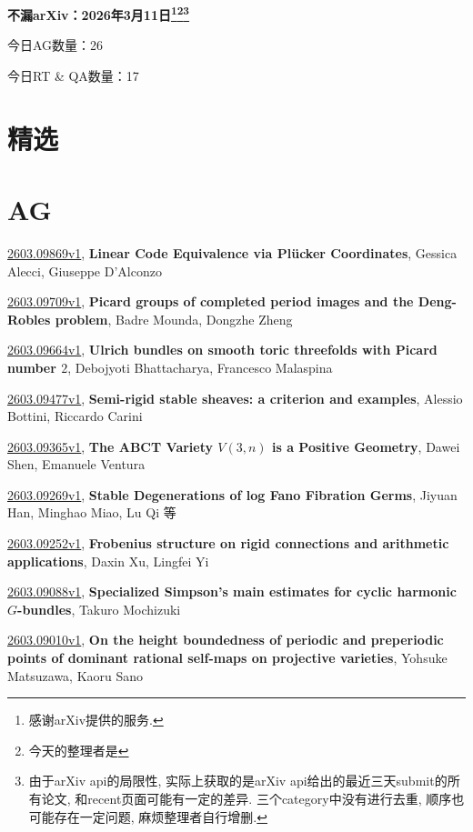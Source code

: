 \documentclass[9pt, a4paper]{article}
\theoremstyle{plain}
\theoremstyle{definition}
\theoremstyle{remark}
\newcommand{\arxiv}[3]{\href{https://arxiv.org/abs/#1}{#1}, \textbf{\textcolor{arxivblue}{#2}}, #3}
\newcommand{\AGnumber}{26}
\newcommand{\RTQAnumber}{17}
\newcommand{\NewestDate}{2026年3月11日}
\newcommand{\todayarXiver}{} %
\begin{document}
\begin{center}
    \Huge\textbf{不漏arXiv：\NewestDate\footnote{感谢arXiv提供的服务.}\footnote{今天的整理者是\todayarXiver}\footnote{由于arXiv api的局限性, 实际上获取的是arXiv api给出的最近三天submit的所有论文, 和recent页面可能有一定的差异. 三个category中没有进行去重, 顺序也可能存在一定问题, 麻烦整理者自行增删.}} \\
\end{center}

\setcounter{section}{-1}

\begin{center}
    今日AG数量：\AGnumber
    
    今日RT \& QA数量：\RTQAnumber
    
\end{center}


\section{精选}


\section{AG}
\arxiv{2603.09869v1}{Linear Code Equivalence via Plücker Coordinates}{Gessica Alecci, Giuseppe D'Alconzo}

\arxiv{2603.09709v1}{Picard groups of completed period images and the Deng-Robles problem}{Badre Mounda, Dongzhe Zheng}

\arxiv{2603.09664v1}{Ulrich bundles on smooth toric threefolds with Picard number $2$}{Debojyoti Bhattacharya, Francesco Malaspina}

\arxiv{2603.09477v1}{Semi-rigid stable sheaves: a criterion and examples}{Alessio Bottini, Riccardo Carini}

\arxiv{2603.09365v1}{The ABCT Variety $V(3,n)$ is a Positive Geometry}{Dawei Shen, Emanuele Ventura}

\arxiv{2603.09269v1}{Stable Degenerations of log Fano Fibration Germs}{Jiyuan Han, Minghao Miao, Lu Qi 等}

\arxiv{2603.09252v1}{Frobenius structure on rigid connections and arithmetic applications}{Daxin Xu, Lingfei Yi}

\arxiv{2603.09088v1}{Specialized Simpson's main estimates for cyclic harmonic $G$-bundles}{Takuro Mochizuki}

\arxiv{2603.09010v1}{On the height boundedness of periodic and preperiodic points of dominant rational self-maps on projective varieties}{Yohsuke Matsuzawa, Kaoru Sano}
\end{document}
